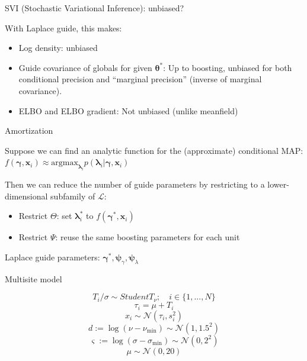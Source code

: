 \documentclass[
  ignorenonframetext,
]{beamer}
\providecommand{\tightlist}{%
  \setlength{\itemsep}{0pt}\setlength{\parskip}{0pt}}
\begin{document}
\begin{frame}{SVI (Stochastic Variational Inference): unbiased?}
\protect\hypertarget{svi-stochastic-variational-inference-unbiased}{}

With Laplace guide, this makes:

\begin{itemize}
\tightlist
\item
  Log density: unbiased
\item
  Guide covariance of globals for given \(\bm{\theta}^*\): Up to
  boosting, unbiased for both conditional precision and ``marginal
  precision'' (inverse of marginal covariance).
\item
  ELBO and ELBO gradient: Not unbiased (unlike meanfield)
\end{itemize}

\end{frame}

\begin{frame}{Amortization}
\protect\hypertarget{amortization}{}

Suppose we can find an analytic function for the (approximate)
conditional MAP:
\(f(\bm{\gamma},\bm{x}_i)\approx \mathrm{argmax}_{\bm{\lambda}_i}p(\bm{\lambda}_i|\bm{\gamma},\bm{x}_i)\)

Then we can reduce the number of guide parameters by restricting to a
lower-dimensional subfamily of \(\mathcal{L}\):

\begin{itemize}
\tightlist
\item
  Restrict \(\Theta\): set \(\bm{\lambda}^*_i\) to
  \(f(\bm{\gamma}^*,\bm{x}_i)\)
\item
  Restrict \(\Psi\): reuse the same boosting parameters for each unit
\end{itemize}

Laplace guide parameters:
\(\bm{\gamma}^*,\bm{\psi}_\gamma,\bm{\psi}_\lambda\)

\end{frame}

\begin{frame}{Multisite model}
\protect\hypertarget{multisite-model}{}

\[T_i/\sigma\sim StudentT_\nu; \quad i\in\{1,...,N\}\]
\[\tau_i=\mu+T_i\] \[x_i\sim\mathcal{N}(\tau_i,s_i^2)\]
\[d := \log(\nu-\nu_{\min})\sim \mathcal{N}(1,1.5^2)\]
\[\varsigma := \log(\sigma-\sigma_{\min})\sim \mathcal{N}(0,2^2)\]
\[\mu\sim\mathcal{N}(0,20)\nonumber\]

\end{frame}
\end{document}
